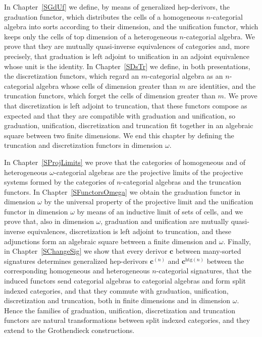 \documentclass[a4paper, reqno]{amsbook}
\newcommand{\htg}{\mathrm{htg}}                %
\theoremstyle{plain}
\theoremstyle{definition}
\begin{document}
In Chapter~\ref{SGdUf} we define, by means of generalized hep-derivors, the graduation functor, which distributes the cells of a homogeneous $n$-categorial algebra into sorts according to their dimension, and the unification functor, which keeps only the cells of top dimension of a heterogeneous $n$-categorial algebra.
We prove that they are mutually quasi-inverse equivalences of categories and, more precisely, that graduation is left adjoint to unification in an adjoint equivalence whose unit is the identity.
In Chapter~\ref{SDsTr} we define, in both presentations, the discretization functors, which regard an $m$-categorial algebra as an $n$-categorial algebra whose cells of dimension greater than $m$ are identities, and the truncation functors, which forget the cells of dimension greater than $m$.
We prove that discretization is left adjoint to truncation, that these functors compose as expected and that they are compatible with graduation and unification, so graduation, unification, discretization and truncation fit together in an algebraic square between two finite dimensions.
We end this chapter by defining the truncation and discretization functors in dimension $\omega$.

In Chapter~\ref{SProjLimits} we prove that the categories of homogeneous and of heterogeneous $\omega$-categorial algebras are the projective limits of the projective systems formed by the categories of $n$-categorial algebras and the truncation functors.
In Chapter~\ref{SFunctorsOmega} we obtain the graduation functor in dimension $\omega$ by the universal property of the projective limit and the unification functor in dimension $\omega$ by means of an inductive limit of sets of cells, and we prove that, also in dimension $\omega$, graduation and unification are mutually quasi-inverse equivalences, discretization is left adjoint to truncation, and these adjunctions form an algebraic square between a finite dimension and $\omega$.
Finally, in Chapter~\ref{SChangeSig} we show that every derivor $\mathbf{c}$ between many-sorted signatures determines generalized hep-derivors $\mathbf{c}^{(n)}$ and $\mathbf{c}^{\htg(n)}$ between the corresponding homogeneous and heterogeneous $n$-categorial signatures, that the induced functors send categorial algebras to categorial algebras and form split indexed categories, and that they commute with graduation, unification, discretization and truncation, both in finite dimensions and in dimension $\omega$. Hence the families of graduation, unification, discretization and truncation functors are natural transformations between split indexed categories, and they extend to the Grothendieck constructions.
\end{document}
